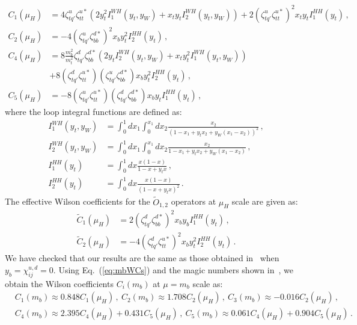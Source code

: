 \documentclass[prd,preprint,superscriptaddress,amsmath,amssymb]{revtex4}
\begin{document}
  \begin{subequations}
 \begin{align}
 C_1(\mu_H) & = 4 \zeta^u_{tq'} \zeta^{u*}_{tt} \left( 2 y^2_t I^{WH}_1(y_t,y_W) + x_t y_t I^{WH}_{2}(y_t,y_W) \right) + 2 \left( \zeta^{u}_{tq'} \zeta^{u*}_{tt} \right)^2  x_t y_t I^{HH}_1(y_t) \,,  \\
 C_2(\mu_H) & = -4 \left( \zeta^{u}_{tq'} \zeta^{d*}_{bb} \right)^2   x_b y^2_t  I^{HH}_{2}(y_t) \,,  \\
 C_4(\mu_H) & = 8 \frac{m^2_b}{m^2_t} \zeta^d_{tq'} \zeta^{d*}_{bb} \left( 2 y_t I^{WH}_{2}(y_t, y_W) + x_t y^2_t I^{WH}_1(y_t,y_W)\right)  \nonumber \\
 &+ 8 (\zeta^d_{tq'} \zeta^{u*}_{tt} )(\zeta^u_{tq'} \zeta^{d*}_{bb}) x_b y^2_t I^{HH}_2 (y_t) \,,  \label{eq:C4muH}\\
 C_5(\mu_H) & = -8 (\zeta^u_{tq'} \zeta^{u*}_{tt}) ( \zeta^d_{tq'} \zeta^{d*}_{bb}) x_b y_t I^{HH}_1(y_t)\,,
 \end{align}
 \end{subequations}
 where the loop integral functions are defined as:
 \begin{subequations}
  \begin{align}
  I^{WH}_1 (y_t, y_W) & =  \int^1_0 dx_1 \int^{x_1}_0 dx_2 \frac{x_2}{(1-x_1 +y_t x_2 + y_W (x_1 -x_2))^2} \,, \\
  I^{WH}_2 (y_t, y_W) & = \int^1_0 dx_1 \int^{x_1}_0 dx_2 \frac{x_2}{1-x_1 +y_t x_2 + y_W (x_1 -x_2)}\,, \\
  I^{HH}_1(y_t) & = \int^1_0 dx \frac{x(1-x)}{1-x +y_t x }\,, \\
   I^{HH}_2(y_t) & = \int^1_0 dx \frac{x(1-x)}{(1-x +y_t x)^2}\,.
  \end{align}
  \end{subequations}
  The effective Wilson coefficients for the $\tilde O_{1,2}$ operators at $\mu_H$ scale are given as:
 \begin{align}
 \tilde{C}_1 (\mu_H) & = 2 \left( \zeta^d_{tq'} \zeta^{d*}_{bb}\right)^2 x_b y_b I^{HH}_1(y_t) \,, \nonumber \\
 \tilde{C}_2(\mu_H) &= -4 \left( \zeta^d_{tq'} \zeta^{u*}_{tt} \right)^2 x_b y^2_t I^{HH}_2(y_t) \,.
 \end{align}
We have checked that  our results are the same as those obtained in~\cite{Urban:1997gw}  when $y_b=\chi^{u,d}_{ij}=0$.
Using  Eq.~(\ref{eq:mbWCs}) and the magic numbers shown in~\cite{Becirevic:2001jj}, we obtain the Wilson coefficients  $C_i(m_b)$ at $\mu=m_b$ scale as:
 \begin{align}
& C_1(m_b) \approx 0.848 C_1(\mu_H)\,, \ C_2(m_b) \approx 1.708 C_2(\mu_H)\,, \ C_3(m_b) \approx -0.016 C_2(\mu_H)\,, \nonumber \\
 & C_{4}(m_b) \approx 2.395 C_{4}(\mu_H) + 0.431 C_{5} (\mu_H)\,, \  C_{5}(m_b) \approx 0.061 C_4(\mu_H) + 0.904 C_5(\mu_H)\,.
 \end{align}
\end{document}
